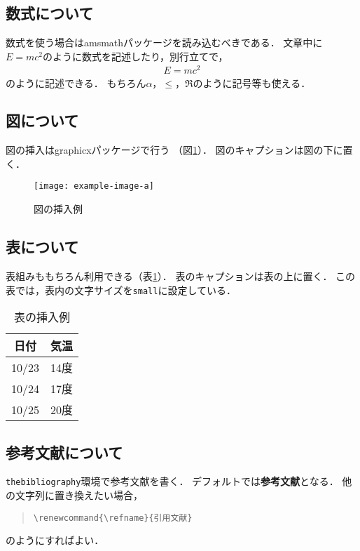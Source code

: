 \documentclass[uplatex, dvipdfmx, fonts=default]{acproceedings}
\begin{document}
\subsection{数式について}

数式を使う場合は\textsf{amsmath}パッケージを読み込むべきである．
文章中に$E=mc^2$のように数式を記述したり，別行立てで，
\begin{align}
	E = mc^2
\end{align}
のように記述できる．
もちろん$\alpha$，$\leq$，$\Re$のように記号等も使える．

\subsection{図について}

図の挿入は\textsf{graphicx}パッケージで行う
（図\ref{fig:sample}）．
図のキャプションは図の下に置く．

\begin{figure}[b]
	\centering
	\texttt{[image: example-image-a]}
	\caption{図の挿入例}
	\label{fig:sample}
\end{figure}

\subsection{表について}

表組みももちろん利用できる（表\ref{tbl:sample}）．
表のキャプションは表の上に置く．
この表では，表内の文字サイズを\texttt{small}に設定している．

\begin{table}[b!]
	\centering\small
	\caption{表の挿入例}
	\label{tbl:sample}
	\begin{tabular}{cr}
		\hline\hline
		日付 & 気温\\\hline
		10/23 & 14度\\
		10/24 & 17度\\
		10/25 & 20度\\\hline
	\end{tabular}
\end{table}

\subsection{参考文献について}

\texttt{thebibliography}環境で参考文献を書く．
デフォルトでは\textbf{参考文献}となる．
他の文字列に置き換えたい場合，
\begin{quote}
	\verb|\renewcommand{\refname}{引用文献}|
\end{quote}
のようにすればよい．
\end{document}
